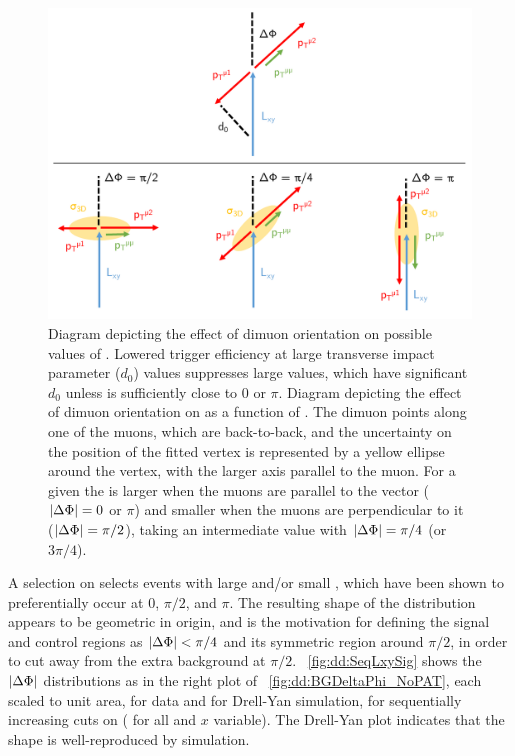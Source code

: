 \begin{figure}[htpb]
  \centering
  \includegraphics[width=1.2\DFigWidth]{figures/displaced/BGEST_WavyExplanationDiagram.pdf}
  \caption[Diagrams depicting the effect of dimuon orientation on possible values of \Lxy and \LxyErr.]{ Diagram depicting the effect of dimuon orientation on possible values of \Lxy. Lowered trigger efficiency at large transverse impact parameter ($d_0$) values suppresses large \Lxy values, which have significant $d_0$ unless \DeltaPhi is sufficiently close to 0 or $\pi$.  Diagram depicting the effect of dimuon orientation on \LxyErr as a function of \DeltaPhi. The dimuon \pT points along one of the muons, which are back-to-back, and the uncertainty on the position of the fitted vertex is represented by a yellow ellipse around the vertex, with the larger axis parallel to the muon. For a given \Lxy the \LxyErr is larger when the muons are parallel to the \Lxy vector (\ie $|\Delta\Phi| = 0$ or $\pi$) and smaller when the muons are perpendicular to it (\ie $|\Delta\Phi| = \pi/2$), taking an intermediate value with $|\Delta\Phi| = \pi/4$ (or $3\pi/4$).}
  \label{fig:dd:BGEST_WavyExplanationDiagram}
\end{figure}

A selection on \LxySig selects events with large \Lxy and/or small \LxyErr, which have been shown to preferentially occur at 0, $\pi/2$, and $\pi$.
The resulting shape of the \DeltaPhi distribution appears to be geometric in origin, and is the motivation for defining the signal and control regions as $|\Delta\Phi| < \pi/4$ and its symmetric region around $\pi/2$, in order to cut away from the extra background at $\pi/2$.
\Fig~\ref{fig:dd:SeqLxySig} shows the $|\Delta\Phi|$ distributions as in the right plot of \Fig~\ref{fig:dd:BGDeltaPhi_NoPAT}, each scaled to unit area, for data and for Drell-Yan simulation, for sequentially increasing cuts on \LxySig (\ie {} for all \DeltaPhi and $x$ variable).
The Drell-Yan plot indicates that the shape is well-reproduced by simulation.

